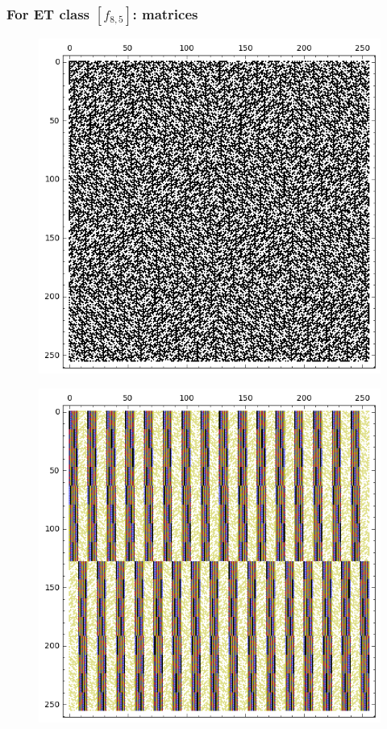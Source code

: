 \documentclass[pdf,sprung,slideColor,nocolorBG]{beamer}
\begin{document}
\begin{frame}
\frametitle{For ET class $[f_{8,5}]$: matrices}
\begin{figure}
\centering
\begin{minipage}{.48\textwidth}
  \centering
  \includegraphics[width=.9\linewidth]{../matrix_plot/c8_5_weight_class_matrix.png}
  \label{fig:8_5_weight_class_matrix}
\end{minipage}%
\begin{minipage}{.48\textwidth}
  \centering
  \includegraphics[width=.9\linewidth]{../matrix_plot/c8_5_bent_cayley_graph_index_matrix.png}
  \label{fig:8_5_bent_cayley_graph_index_matrix}
\end{minipage}
\end{figure}
~
\end{frame}
\end{document}
